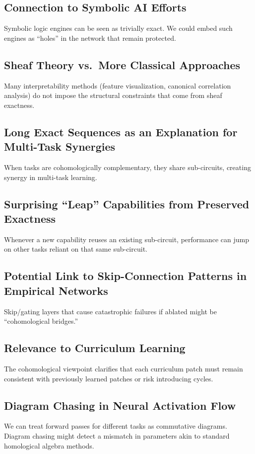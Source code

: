 \documentclass{article}
\begin{document}
\subsection{Connection to Symbolic AI Efforts}
Symbolic logic engines can be seen as trivially exact. We could embed such engines as “holes” in the network that remain protected.

\subsection{Sheaf Theory vs.\ More Classical Approaches}
Many interpretability methods (feature visualization, canonical correlation analysis) do not impose the structural constraints that come from sheaf exactness.

\subsection{Long Exact Sequences as an Explanation for Multi-Task Synergies}
When tasks are cohomologically complementary, they share sub-circuits, creating synergy in multi-task learning.

\subsection{Surprising “Leap” Capabilities from Preserved Exactness}
Whenever a new capability reuses an existing sub-circuit, performance can jump on other tasks reliant on that same sub-circuit.

\subsection{Potential Link to Skip-Connection Patterns in Empirical Networks}
Skip/gating layers that cause catastrophic failures if ablated might be “cohomological bridges.”

\subsection{Relevance to Curriculum Learning}
The cohomological viewpoint clarifies that each curriculum patch must remain consistent with previously learned patches or risk introducing cycles.

\subsection{Diagram Chasing in Neural Activation Flow}
We can treat forward passes for different tasks as commutative diagrams. Diagram chasing might detect a mismatch in parameters akin to standard homological algebra methods.
\end{document}
